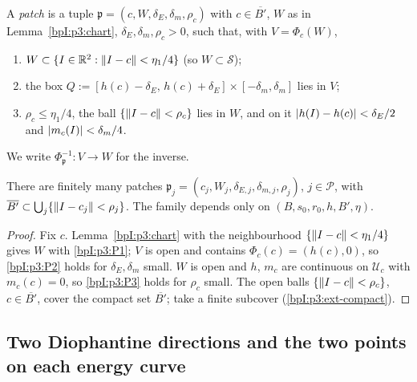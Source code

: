 \begin{definition}[Patch]\label{bpI:p3:patch}
A \emph{patch} is a tuple $\mathfrak p=(c,W,\delta_E,\delta_m,\rho_c)$ with $c\in\overline{B'}$, $W$ as in Lemma~\ref{bpI:p3:chart}, $\delta_E,\delta_m,\rho_c>0$, such that, with
$V=\Phi_c(W)$,
\begin{enumerate}[label=(P\arabic*)]
\item\label{bpI:p3:P1} $W\subset\{I\in\mathbb{R}^2:\lVert I-c\rVert<\eta_1/4\}$ (so $W\subset\mathcal S$);
\item\label{bpI:p3:P2} the box $Q:=[h(c)-\delta_E,\,h(c)+\delta_E]\times[-\delta_m,\delta_m]$ lies in $V$;
\item\label{bpI:p3:P3} $\rho_c\le\eta_1/4$, the ball $\{\lVert I-c\rVert<\rho_c\}$ lies in $W$, and on it $\lvert h(I)-h(c)\rvert<\delta_E/2$ and $\lvert m_c(I)\rvert<\delta_m/4$.
\end{enumerate}
We write $\Phi_{\mathfrak p}^{-1}:V\to W$ for the inverse.
\end{definition}

\begin{lemma}\label{bpI:p3:cover}
There are finitely many patches $\mathfrak p_j=(c_j,W_j,\delta_{E,j},\delta_{m,j},\rho_j)$, $j\in\mathcal P$, with
$\overline{B'}\subset\bigcup_j\{\lVert I-c_j\rVert<\rho_j\}$. The family depends only on $(B,s_0,r_0,h,B',\eta)$.
\end{lemma}
\begin{proof}
\label{stepI:p3:cv-local}
Fix $c$. Lemma~\ref{bpI:p3:chart} with the neighbourhood $\{\lVert I-c\rVert<\eta_1/4\}$ gives $W$ with \ref{bpI:p3:P1}; $V$ is open and contains $\Phi_c(c)=(h(c),0)$, so
\ref{bpI:p3:P2} holds for $\delta_E,\delta_m$ small. $W$ is open and $h$, $m_c$ are continuous on $\mathcal U_c$ with $m_c(c)=0$, so \ref{bpI:p3:P3} holds for $\rho_c$ small.
\label{stepI:p3:cv-compact}
The open balls $\{\lVert I-c\rVert<\rho_c\}$, $c\in\overline{B'}$, cover the compact set $\overline{B'}$; take a finite subcover (\ref{bpI:p3:ext-compact}).
\end{proof}

\subsection{Two Diophantine directions and the two points on each energy curve}\label{bpI:p3:sec-rays}

